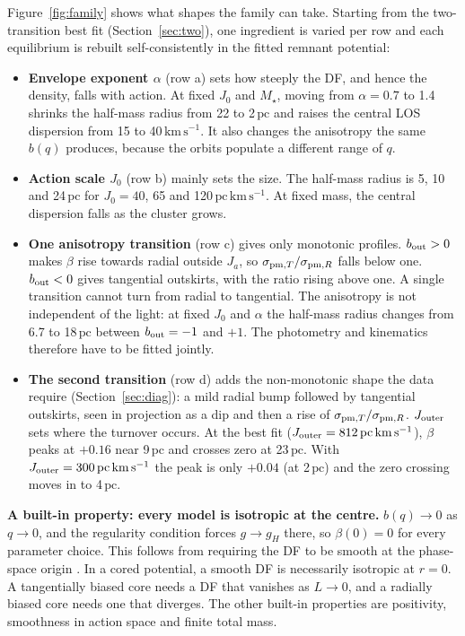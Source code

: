 \documentclass[11pt,a4paper]{article}
\newcommand{\pc}{\ensuremath{\,\mathrm{pc}}\xspace}
\newcommand{\kms}{\ensuremath{\,\mathrm{km\,s^{-1}}}\xspace}
\newcommand{\Jact}{\ensuremath{\,\mathrm{pc\,km\,s^{-1}}}\xspace}
\begin{document}
Figure~\ref{fig:family} shows what shapes the family can take. Starting from
the two-transition best fit (Section~\ref{sec:two}), one ingredient is varied
per row and each equilibrium is rebuilt self-consistently in the fitted
remnant potential:
\begin{itemize}
\item \textbf{Envelope exponent $\alpha$} (row a) sets how steeply the DF, and
  hence the density, falls with action. At fixed $J_0$ and $M_\star$, moving
  from $\alpha=0.7$ to 1.4 shrinks the half-mass radius from 22 to 2\pc and
  raises the central LOS dispersion from 15 to 40\kms. It also changes the
  anisotropy the same $b(q)$ produces, because the orbits populate a different
  range of $q$.
\item \textbf{Action scale $J_0$} (row b) mainly sets the size. The half-mass
  radius is 5, 10 and 24\pc for $J_0=40$, 65 and 120\Jact. At fixed mass,
  the central dispersion falls as the cluster grows.
\item \textbf{One anisotropy transition} (row c) gives only monotonic profiles.
  $b_{\rm out}>0$ makes $\beta$ rise towards radial outside $J_a$, so
  $\sigma_{{\rm pm},T}/\sigma_{{\rm pm},R}$ falls below one. $b_{\rm out}<0$
  gives tangential outskirts, with the ratio rising above one. A single
  transition cannot turn from radial to tangential. The anisotropy is not
  independent of the light: at fixed $J_0$ and $\alpha$ the half-mass radius
  changes from 6.7 to 18\pc between $b_{\rm out}=-1$ and $+1$. The photometry
  and kinematics therefore have to be fitted jointly.
\item \textbf{The second transition} (row d) adds the non-monotonic shape the
  data require (Section~\ref{sec:diag}): a mild radial bump followed by
  tangential outskirts, seen in projection as a dip and then a rise of
  $\sigma_{{\rm pm},T}/\sigma_{{\rm pm},R}$. $J_{\rm outer}$ sets where the
  turnover occurs. At the best fit ($J_{\rm outer}=812\Jact$), $\beta$ peaks
  at $+0.16$ near 9\pc and crosses zero at 23\pc. With $J_{\rm outer}=300\Jact$
  the peak is only $+0.04$ (at 2\pc) and the zero crossing moves in to 4\pc.
\end{itemize}

\textbf{A built-in property: every model is isotropic at the centre.}
$b(q)\to0$ as $q\to0$, and the regularity condition forces $g\to g_H$ there,
so $\beta(0)=0$ for every parameter choice. This follows from requiring the DF
to be smooth at the phase-space origin \citep{2026MNRAS.549ag854B}. In a cored
potential, a smooth DF is necessarily isotropic at $r=0$. A tangentially
biased core needs a DF that vanishes as $L\to0$, and a radially biased core
needs one that diverges. The other built-in properties are positivity,
smoothness in action space and finite total mass.
\end{document}
